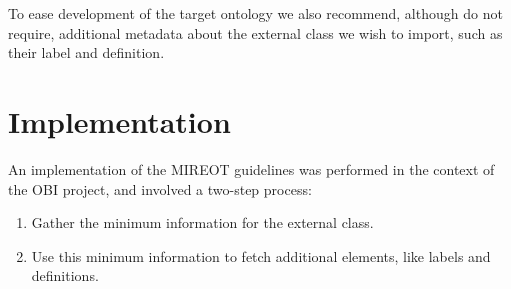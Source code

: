 \documentclass[a4paper,10pt,twocolumn]{article}
\newcommand{\protege}{Prot\'{e}g\'{e}}
\begin{document}


To ease development of the target ontology we also recommend, although do not require, additional metadata about the external class we wish to import, such as their label and definition.





\section*{Implementation}

An implementation of the \ac{MIREOT} guidelines was performed in the context of the \ac{OBI} project, and involved a two-step process:

\begin{enumerate}
\item Gather the minimum information for the external class.
\item Use this minimum information to fetch additional elements, like labels and definitions.
\end{enumerate}

\end{document}

